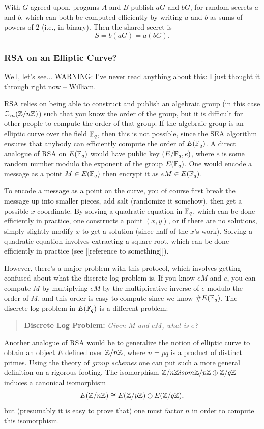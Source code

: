 \documentclass{book}
\begin{document}
With $G$ agreed upon, progams $A$ and $B$ publish
$aG$ and $bG$, for random secrets $a$ and $b$,
which can both be computed efficiently by writing
$a$ and $b$ as sums of powers of $2$ (i.e., in binary).
Then the shared secret is
$$
S=b (a G) = a (b G).
$$


\subsubsection{RSA on an Elliptic Curve?}
Well, let's see...  WARNING: I've never
read anything about this: I just thought it through right now -- William.

RSA relies on being able to construct and publish
an algebraic
group (in this case $\mathbb{G}_m(\mathbb{Z}/n\mathbb{Z})$)
such that you know the order of the group,
but it is difficult for other people to compute
the order of that group.
If the algebraic group is an elliptic curve over
the field $\mathbb{F}_q$, then this is not possible,
since the SEA algorithm ensures that anybody can efficiently
compute the order of $E(\mathbb{F}_q)$.
A direct analogue of RSA on $E(\mathbb{F}_q)$ would
have public key $(E/\mathbb{F}_q, e)$, where $e$
is some random number modulo the exponent
of the group $E(\mathbb{F}_q)$.
One would encode a message as a point $M \in E(\mathbb{F}_q)$
then encrypt it as $e M \in E(\mathbb{F}_q)$.

To encode a message as a point on the curve, you of course
first break the message up into smaller pieces, add salt (randomize it somehow), then get a possible $x$ coordinate.  By solving a quadratic
equation in $\mathbb{F}_q$, which can be done efficiently in practice, one
constructs a point $(x,y)$, or if there are no solutions, simply slightly
modify $x$ to get a solution (since half of the $x$'s work).  Solving
a quadratic equation involves extracting a square root, which can be done
efficiently in practice (see [[reference to something]]).

However, there's a major problem with this protocol, which involves
getting confused about what the discrete log problem is.
If you know $e M$ and $e$, you can
compute $M$ by multiplying $e M$ by the multiplicative
inverse of $e$ modulo the order of $M$, and this order
is easy to compute since we know $\# E(\mathbb{F}_q)$.
The discrete log problem in $E(\mathbb{F}_q)$ is a different problem:
\begin{quote}
{\bf Discrete Log Problem: } {\em Given $M$ and $e M$, what is $e$?}
\end{quote}

Another analogue of RSA would be to generalize the
notion of elliptic curve to obtain an object
$E$ defined over $\mathbb{Z}/n\mathbb{Z}$,
where $n=pq$ is a product of distinct primes.
Using the theory of {\em group schemes} one can
put such a more general definition on a rigorous footing.
The isomorphism $\mathbb{Z}/n\mathbb{Z}\\isom \mathbb{Z}/p\mathbb{Z} \oplus \mathbb{Z}/q\mathbb{Z}$ induces
a canonical isomorphism
\begin{equation}\label{eq:ellisom}
  E(\mathbb{Z}/n\mathbb{Z}) \cong E(\mathbb{Z}/p\mathbb{Z}) \oplus E(\mathbb{Z}/q\mathbb{Z}),
\end{equation}
but (presumably it is easy to prove that)
one must factor $n$ in order to compute
this isomorphism.
\end{document}
